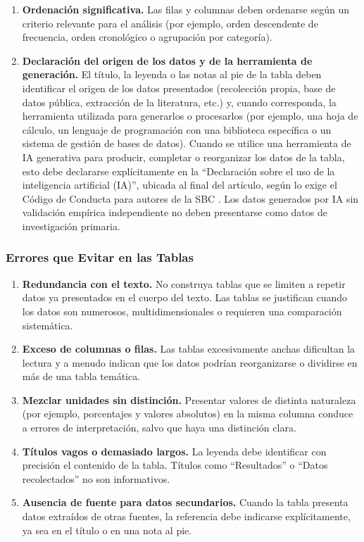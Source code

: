 \documentclass[spanish]{rbie2026}%
\begin{document}
\begin{enumerate}
  \item \textbf{Ordenación significativa.} Las filas y columnas deben ordenarse según un criterio relevante para el análisis (por ejemplo, orden descendente de frecuencia, orden cronológico o agrupación por categoría).

  \item \textbf{Declaración del origen de los datos y de la herramienta de generación.} El título, la leyenda o las notas al pie de la tabla deben identificar el origen de los datos presentados (recolección propia, base de datos pública, extracción de la literatura, etc.) y, cuando corresponda, la herramienta utilizada para generarlos o procesarlos (por ejemplo, una hoja de cálculo, un lenguaje de programación con una biblioteca específica o un sistema de gestión de bases de datos). Cuando se utilice una herramienta de IA generativa para producir, completar o reorganizar los datos de la tabla, esto debe declararse explícitamente en la ``Declaración sobre el uso de la inteligencia artificial (IA)'', ubicada al final del artículo, según lo exige el Código de Conducta para autores de la SBC \citeyearpar{SBC2024conduta_pt}. Los datos generados por IA sin validación empírica independiente no deben presentarse como datos de investigación primaria.
\end{enumerate}


\subsubsection{Errores que Evitar en las Tablas}

\begin{enumerate}
  \item \textbf{Redundancia con el texto.} No construya tablas que se limiten a repetir datos ya presentados en el cuerpo del texto. Las tablas se justifican cuando los datos son numerosos, multidimensionales o requieren una comparación sistemática.

  \item \textbf{Exceso de columnas o filas.} Las tablas excesivamente anchas dificultan la lectura y a menudo indican que los datos podrían reorganizarse o dividirse en más de una tabla temática.

  \item \textbf{Mezclar unidades sin distinción.} Presentar valores de distinta naturaleza (por ejemplo, porcentajes y valores absolutos) en la misma columna conduce a errores de interpretación, salvo que haya una distinción clara.

  \item \textbf{Títulos vagos o demasiado largos.} La leyenda debe identificar con precisión el contenido de la tabla. Títulos como ``Resultados'' o ``Datos recolectados'' no son informativos.

  \item \textbf{Ausencia de fuente para datos secundarios.} Cuando la tabla presenta datos extraídos de otras fuentes, la referencia debe indicarse explícitamente, ya sea en el título o en una nota al pie.
\end{enumerate}
\end{document}
